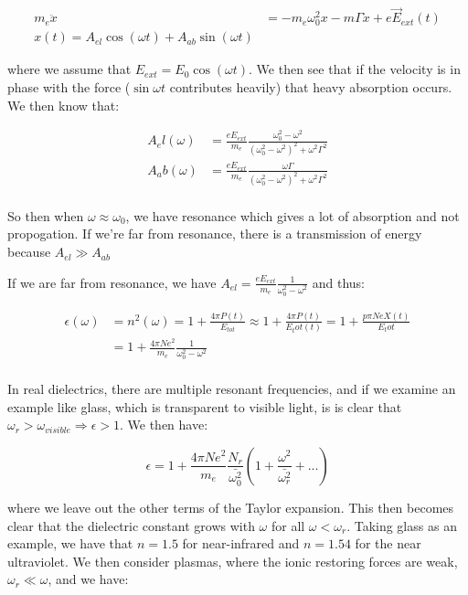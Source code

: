 \documentclass{report}
\begin{document}
\begin{align*}
m_e\ddot{x} &= -m_e\omega_0^2x - m\Gamma\dot{x} + e\vec{E}_{ext}(t)\\
x(t) = A_{el}\cos(\omega t) + A_{ab}\sin(\omega t)
\end{align*}

where we assume that $E_{ext} = E_0\cos(\omega t)$. We then see that if the velocity is in phase with the force ($\sin\omega t$ contributes heavily) that heavy absorption occurs. We then know that:

\begin{align*}
A_el(\omega) &= \frac{eE_{ext}}{m_e}\frac{\omega_0^2 - \omega^2}{(\omega_0^2 - \omega^2)^2 + \omega^2\Gamma^2}\\
A_ab(\omega) &= \frac{eE_{ext}}{m_e} \frac{\omega\Gamma}{(\omega_0^2 - \omega^2)^2 + \omega^2\Gamma^2}\\
\end{align*}

So then when $\omega \approx \omega_0$, we have resonance which gives a lot of absorption and not propogation. If we're far from resonance, there is a transmission of energy because $A_{el} \gg A_{ab}$

If we are far from resonance, we have $A_{el} = \frac{eE_{ext}}{m_e}\frac{1}{\omega_0^2 - \omega^2}$ and thus:

\begin{align*}
\epsilon(\omega) &= n^2(\omega) = 1 + \frac{4\pi P(t)}{E_{tot}} \approx 1 + \frac{4\pi P(t)}{E_tot(t)} = 1 + \frac{p\pi N e X(t)}{E_tot}\\
&= 1 + \frac{4\pi Ne^2}{m_e}\frac{1}{\omega_0^2 - \omega^2}\\
\end{align*}

In real dielectrics, there are multiple resonant frequencies, and if we examine an example like glass, which is transparent to visible light, is is clear that $\omega_r > \omega_{visible} \Rightarrow \epsilon > 1$. We then have:

$$\epsilon = 1 + \frac{4\pi Ne^2}{m_e}\frac{N_r}{\bar{\omega_0^2}}\left(1 + \frac{\omega^2}{\bar{\omega_r^2}} +...\right)$$

where we leave out the other terms of the Taylor expansion. This then becomes clear that the dielectric constant grows with $\omega$ for all $\omega < \omega_r$. Taking glass as an example, we have that $n=1.5$ for near-infrared and $n=1.54$ for the near ultraviolet. We then consider plasmas, where the ionic restoring forces are weak, $\omega_r \ll \omega$, and we have:
\end{document}
